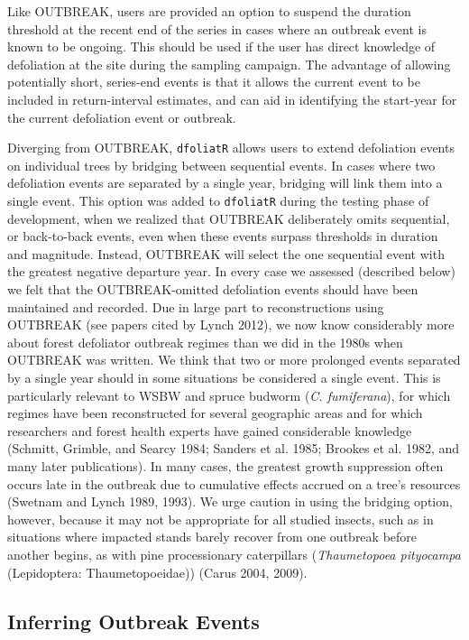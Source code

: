 \documentclass[review]{elsarticle} %
\begin{document}
Like OUTBREAK, users are provided an option to suspend the duration threshold at the recent end of the series in cases where an outbreak event is known to be ongoing. This should be used if the user has direct knowledge of defoliation at the site during the sampling campaign. The advantage of allowing potentially short, series-end events is that it allows the current event to be included in return-interval estimates, and can aid in identifying the start-year for the current defoliation event or outbreak.

Diverging from OUTBREAK, \texttt{dfoliatR} allows users to extend defoliation events on individual trees by bridging between sequential events. In cases where two defoliation events are separated by a single year, bridging will link them into a single event. This option was added to \texttt{dfoliatR} during the testing phase of development, when we realized that OUTBREAK deliberately omits sequential, or back-to-back events, even when these events surpass thresholds in duration and magnitude. Instead, OUTBREAK will select the one sequential event with the greatest negative departure year. In every case we assessed (described below) we felt that the OUTBREAK-omitted defoliation events should have been maintained and recorded. Due in large part to reconstructions using OUTBREAK (see papers cited by Lynch 2012), we now know considerably more about forest defoliator outbreak regimes than we did in the 1980s when OUTBREAK was written. We think that two or more prolonged events separated by a single year should in some situations be considered a single event. This is particularly relevant to WSBW and spruce budworm (\emph{C. fumiferana}), for which regimes have been reconstructed for several geographic areas and for which researchers and forest health experts have gained considerable knowledge (Schmitt, Grimble, and Searcy 1984; Sanders et al. 1985; Brookes et al. 1982, and many later publications). In many cases, the greatest growth suppression often occurs late in the outbreak due to cumulative effects accrued on a tree's resources (Swetnam and Lynch 1989, 1993). We urge caution in using the bridging option, however, because it may not be appropriate for all studied insects, such as in situations where impacted stands barely recover from one outbreak before another begins, as with pine processionary caterpillars (\emph{Thaumetopoea pityocampa} (Lepidoptera: Thaumetopoeidae)) (Carus 2004, 2009).

\hypertarget{inferring-outbreak-events}{%
\subsection{Inferring Outbreak Events}\label{inferring-outbreak-events}}
\end{document}
